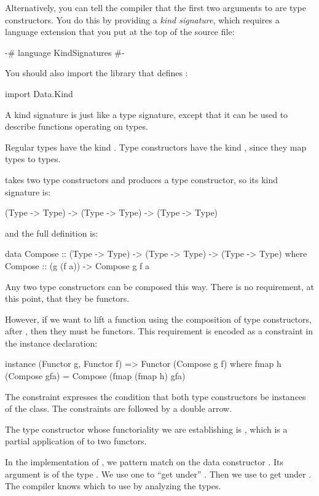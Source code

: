 \documentclass[DaoFP]{subfiles}
\begin{document}
Alternatively, you can tell the compiler that the first two arguments to  are type constructors. You do this by providing a \emph{kind signature}, which requires a language extension  that you put at the top of the source file:
\begin{haskell}
{-# language KindSignatures #-}
\end{haskell}
You should also import the  library that defines :
\begin{haskell}
import Data.Kind
\end{haskell}

A kind signature is just like a type signature, except that it can be used to describe functions operating on types. 

Regular types have the kind . Type constructors have the kind , since they map types to types. 

 takes two type constructors and produces a type constructor, so its kind signature is:
\begin{haskell}
(Type -> Type) -> (Type -> Type) -> (Type -> Type) 
\end{haskell}
and the full definition is:
\begin{haskell}
data Compose :: (Type -> Type) -> (Type -> Type) -> (Type -> Type) 
  where
    Compose :: (g (f a)) -> Compose g f a
\end{haskell}

Any two type constructors can be composed this way. There is no requirement, at this point, that they be functors. 

However, if we want to lift a function using the composition of type constructors,  after , then they must be functors. This requirement is encoded as a constraint in the instance declaration:
\begin{haskell}
instance (Functor g, Functor f) => Functor (Compose g f) where
  fmap h (Compose gfa) = Compose (fmap (fmap h) gfa)
\end{haskell}
The constraint  expresses the condition that both type constructors be instances of the  class. The constraints are followed by a double arrow. 

The type constructor whose functoriality we are establishing is , which is a partial application of  to two functors. 

In the implementation of , we pattern match on the data constructor . Its argument  is of the type . We use one  to ``get under'' . Then we use  to get under . The compiler knows which  to use by analyzing the types. 
\end{document}

